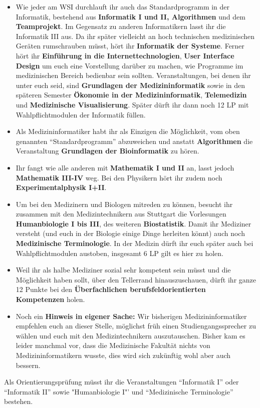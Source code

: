 \begin{itemize}
	\item Wie jeder am WSI durchlauft ihr auch das Standardprogramm in der Informatik, bestehend aus \textbf{Informatik I und II, Algorithmen} und dem \textbf{Teamprojekt}. Im Gegensatz zu anderen Informatikern lasst ihr die Informatik III aus. Da ihr später vielleicht an hoch technischen medizinischen Geräten rumschrauben müsst, hört ihr \textbf{Informatik der Systeme}. Ferner hört ihr \textbf{Einführung in die Internettechnologien}, \textbf{User Interface Design} um euch eine Vorstellung darüber zu machen, wie Programme im medizinischen Bereich bedienbar sein sollten. Veranstaltungen, bei denen ihr unter euch seid, sind \textbf{Grundlagen der Medizininformatik} sowie in den späteren Semester \textbf{Ökonomie in der Medizininformatik}, \textbf{Telemedizin} und \textbf{Medizinische Visualisierung}. Später dürft ihr dann noch 12 LP mit Wahlpflichtmodulen der Informatik füllen.
	\item Als Medizininformatiker habt ihr als Einzigen die Möglichkeit, vom oben genannten "`Standardprogramm"' abzuweichen und anstatt \textbf{Algorithmen} die Veranstaltung \textbf{Grundlagen der Bioinformatik} zu hören.
	\item Ihr fangt wie alle anderen mit \textbf{Mathematik I und II} an, lasst jedoch \textbf{Mathematik III-IV} weg.  Bei den Physikern hört ihr zudem noch \textbf{Experimentalphysik I+II}.
	\item Um bei den Medizinern und Biologen mitreden zu können, besucht ihr zusammen mit den Medizintechnikern aus Stuttgart die Vorlesungen \textbf{Humanbiologie I bis III}, des weiteren \textbf{Biostatistik}. Damit ihr Mediziner versteht (und euch in der Biologie einige Dinge herleiten könnt) auch noch \textbf{Medizinische Terminologie}. In der Medizin dürft ihr euch später auch bei Wahlpflichtmodulen austoben, insgesamt 6 LP gilt es hier zu holen.
	\item Weil ihr als halbe Mediziner sozial sehr kompetent sein müsst und die Möglichkeit haben sollt, über den Tellerrand hinauszuschauen, dürft ihr ganze 12 Punkte bei den \textbf{Überfachlichen berufsfeldorientierten Kompetenzen} holen.
	\item Noch ein \textbf{Hinweis in eigener Sache:} Wir bisherigen Medizininformatiker empfehlen euch an dieser Stelle, möglichst früh einen Studiengangssprecher zu wählen und euch mit den Medizintechnikern auszutauschen. Bisher kam es leider manchmal vor, dass die Medizinische Fakultät nichts von Medizininformatikern wusste, dies wird sich zukünftig wohl aber auch bessern.
\end{itemize}

Als Orientierungsprüfung müsst ihr die Veranstaltungen "`Informatik I"' oder "`Informatik II"' sowie "Humanbiologie I"' und "`Medizinische Terminologie"' bestehen.

